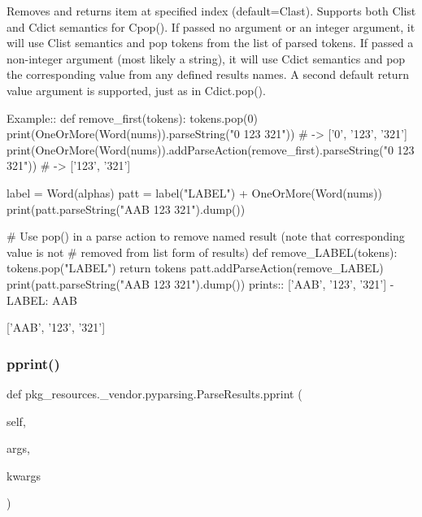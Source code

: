 \begin{DoxyVerb}Removes and returns item at specified index (default=C{last}).
Supports both C{list} and C{dict} semantics for C{pop()}. If passed no
argument or an integer argument, it will use C{list} semantics
and pop tokens from the list of parsed tokens. If passed a 
non-integer argument (most likely a string), it will use C{dict}
semantics and pop the corresponding value from any defined 
results names. A second default return value argument is 
supported, just as in C{dict.pop()}.

Example::
    def remove_first(tokens):
tokens.pop(0)
    print(OneOrMore(Word(nums)).parseString("0 123 321")) # -> ['0', '123', '321']
    print(OneOrMore(Word(nums)).addParseAction(remove_first).parseString("0 123 321")) # -> ['123', '321']

    label = Word(alphas)
    patt = label("LABEL") + OneOrMore(Word(nums))
    print(patt.parseString("AAB 123 321").dump())

    # Use pop() in a parse action to remove named result (note that corresponding value is not
    # removed from list form of results)
    def remove_LABEL(tokens):
tokens.pop("LABEL")
return tokens
    patt.addParseAction(remove_LABEL)
    print(patt.parseString("AAB 123 321").dump())
prints::
    ['AAB', '123', '321']
    - LABEL: AAB

    ['AAB', '123', '321']
\end{DoxyVerb}
 \mbox{\label{classpkg__resources_1_1__vendor_1_1pyparsing_1_1_parse_results_a584f4c008b1c702a394e8295d878edda}} 
\subsubsection{\texorpdfstring{pprint()}{pprint()}}
{\footnotesize\ttfamily def pkg\+\_\+resources.\+\_\+vendor.\+pyparsing.\+Parse\+Results.\+pprint (\begin{DoxyParamCaption}\item[{}]{self,  }\item[{}]{args,  }\item[{}]{kwargs }\end{DoxyParamCaption})}

